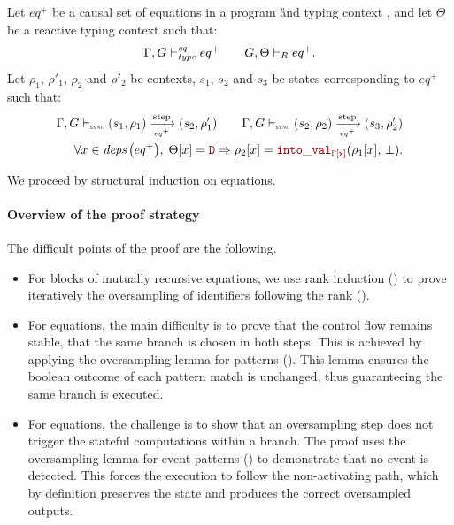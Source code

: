 \begin{skippableproof}
    Let $eq^+$ be a causal set of equations in a program \G and typing context \tyCtx, and let
    $\Theta$ be a reactive typing context such that:
    \begin{equation*}
        \Gamma, G \vdash_{\textit{type}}^{\textit{eq}} eq^+ \qquad G, \Theta \vdash_R eq^+.
    \end{equation*}
    Let $\rho_1$, $\rho'_1$, $\rho_2$ and $\rho'_2$ be contexts, $s_1$, $s_2$ and $s_3$ be states
    corresponding to $eq^+$ such that:
    \begin{align*}
        \eqOpsem{\rho_1}{s_1}{eq^+}{s_2}{\rho'_1} \qquad \eqOpsem{\rho_2}{s_2}{eq^+}{s_3}{\rho'_2} \\
        \forall x \in \deps{eq^+}, \; \Theta[x] = \dType \Rightarrow \rho_2[x] = \intoVal{\tyCtx[x]}{\rho_1[x]}{\bot}.
    \end{align*}

    We proceed by structural induction on \GRSync equations.

    \paragraph{Overview of the proof strategy}
    The difficult points of the proof are the following.
    \begin{itemize}
        \item For blocks of mutually recursive equations, we use rank induction
              () to prove iteratively the
              oversampling of identifiers following the rank
              ().
        \item For  equations, the main difficulty is to prove that the control flow
              remains stable, \ie that the same branch is chosen in both steps. This is achieved by
              applying the oversampling lemma for patterns
              (). This lemma ensures the
              boolean outcome of each pattern match is unchanged, thus guaranteeing the same branch
              is executed.
        \item For  equations, the challenge is to show that an oversampling step does not
              trigger the stateful computations within a branch. The proof uses the oversampling
              lemma for event patterns () to
              demonstrate that no event is detected. This forces the execution to follow the
              non-activating path, which by definition preserves the state and produces the correct
              oversampled outputs.
    \end{itemize}


\end{skippableproof}
